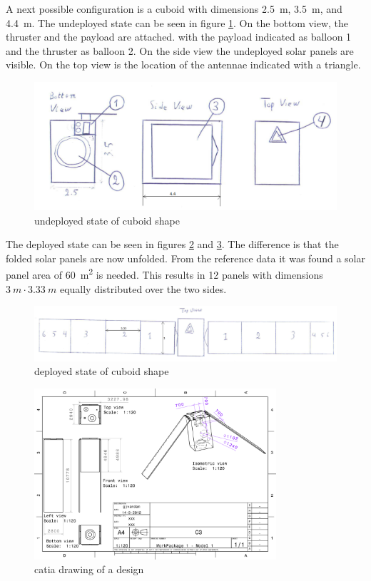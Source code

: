 A next possible configuration is a cuboid with
dimensions \SI{2.5}{m}, \SI{3.5}{m}, and \SI{4.4}{m}. The undeployed
state can be seen in figure \ref{sketch2}. On the bottom view, the
thruster and the payload are attached. with the payload indicated as
balloon 1 and the thruster as balloon 2. On the side view the
undeployed solar panels are visible. On the top view is the location
of the antennae indicated with a triangle.
\begin{figure}[ht]
  \centering
  \includegraphics[width=\textwidth]{boxundeployed}
  \caption{undeployed state of cuboid shape}
  \label{sketch2}
\end{figure}

The deployed state can be seen in figures \ref{sketch3} and
\ref{sketch3-1}. The difference is that the folded solar panels are
now unfolded. From the reference data it was found a solar panel area
of \SI{60}{m^2} is needed. This results in 12 panels with dimensions
$\SI{3}{m}\cdot\SI{3.33}{m}$ equally distributed over the two sides.

\begin{figure}[ht]
  \centering
  \includegraphics[width=\textwidth]{boxdeployed}
  \caption{deployed state of cuboid shape}
  \label{sketch3}
\end{figure}


\begin{figure}[H]
  \centering
  \includegraphics[angle=90, width=0.8\textwidth]{catiadraw1}
  \caption{catia drawing of a design}
  \label{sketch3-1}
\end{figure}

